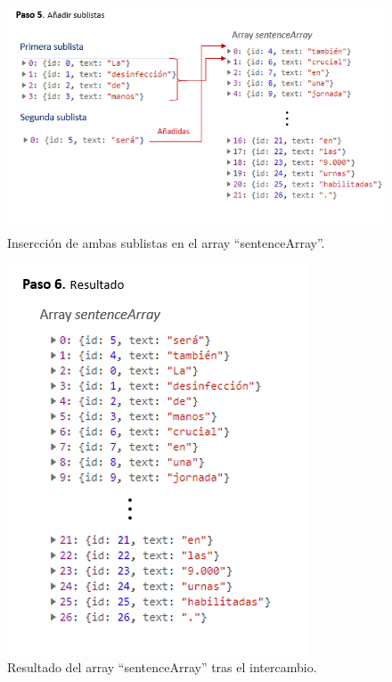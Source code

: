 \begin{itemize}
\begin{itemize}
\begin{figure}[h!]
	
	\includegraphics[scale=1.1]{Imagenes/Figuras/IntercambioPaso5}
	
	
	\caption{Insercción de ambas sublistas en el array ``sentenceArray''.}
	\label{fig:paso5}
\end{figure}
	\begin{figure}[h!]
	\centering
	
	
	\includegraphics[scale=1.3]{Imagenes/Figuras/IntercambioPaso6}
	
	
	\caption{Resultado del array ``sentenceArray'' tras el intercambio.}
	\label{fig:paso6}
\end{figure}

		
	
	\end{itemize}


\end{itemize}
